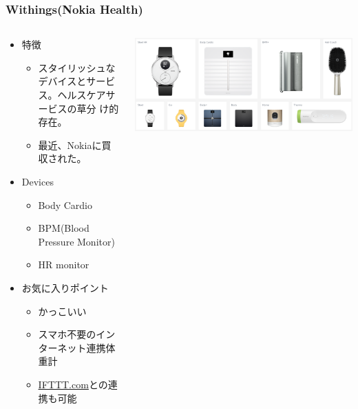 \documentclass[aspectratio=169,11pt,hyperref={colorlinks=true}]{beamer}
\begin{document}
\begin{frame}
  \frametitle{Withings(Nokia Health)}
  \begin{columns}[T]
    \begin{column}{.50\textwidth}
      \begin{itemize}
      \item[] 特徴
        \begin{itemize}
        \item スタイリッシュなデバイスとサービス。ヘルスケアサービスの草分
          け的存在。
        \item 最近、Nokiaに買収された。
        \end{itemize}
      \item[] Devices
        \begin{itemize}
        \item Body Cardio
        \item BPM(Blood Pressure Monitor)
        \item HR monitor
        \end{itemize}
      \item[] お気に入りポイント
        \begin{itemize}
        \item かっこいい
        \item スマホ不要のインターネット連携体重計
        \item \href{https://ifttt.com}{IFTTT.com}との連携も可能
        \end{itemize}
      \end{itemize}
    \end{column}
    \begin{column}{.50\textwidth}
      \begin{center}
        \includegraphics[width=1.1\textwidth]{withings_products.png}
      \end{center}
    \end{column}
  \end{columns}
\end{frame}
\end{document}
